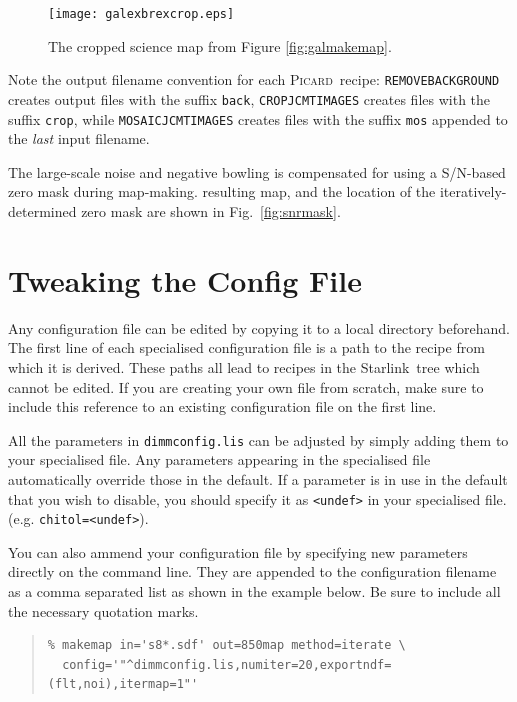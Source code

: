 \documentclass[twoside,11pt]{article}
\newcommand{\htmladdnormallink}[2]{#1}
\newcommand{\xref}[3]{#1}
\newcommand{\xlabel}[1]{}
\renewcommand{\_}{\texttt{\symbol{95}}}
\newenvironment{myquote}{\begin{quote}\begin{small}}{\end{small}\end{quote}}
\newcommand{\starlink}{\htmladdnormallink{Starlink}{http://starlink.jach.hawaii.edu}}
\newcommand{\picard}{\xref{\textsc{Picard}}{sun265}{}}
\newcommand{\drrecipe}[1]{\texttt{#1}}
\begin{document}
\begin{figure}
\begin{center}
\texttt{[image: galex\_brex\_crop.eps]}
\caption{\small The cropped science map from Figure \ref{fig:galmakemap}.}
\label{fig:exptime}
\end{center}
\end{figure}

Note the output filename convention for each \picard\ recipe:
\drrecipe{REMOVE\_BACKGROUND} creates output files with the suffix
\texttt{\_back}, \drrecipe{CROP\_JCMT\_IMAGES} creates files with the
suffix \texttt{\_crop}, while \drrecipe{MOSAIC\_JCMT\_IMAGES} creates
files with the suffix \texttt{\_mos} appended to the \textit{last} input
filename.

The large-scale noise and negative bowling is compensated for using a
S/N-based zero mask during map-making. resulting map, and the location of the
iteratively-determined zero mask are shown in Fig.~\ref{fig:snrmask}.



\clearpage
\section{\xlabel{tweak}Tweaking the Config File}
\label{sec:tweak}
Any configuration file can be edited by copying it to a local directory beforehand. The first line of each specialised configuration file is a path to the recipe from which it is derived. These paths all lead to recipes in the \starlink\ tree which cannot be edited. If you are creating your own file from scratch, make sure to include this reference to an existing configuration file on the first line.

All the parameters in \texttt{dimmconfig.lis} can be adjusted by simply adding them to your specialised file. Any parameters appearing in the specialised file automatically override those in the default. If a parameter is in use in the default that you wish to disable, you should specify it as \texttt{<undef>} in your specialised file. (e.g. \texttt{chitol=<undef>}).

You can also ammend your configuration file by specifying new parameters directly on the command line. They are appended to the configuration  filename as a comma separated list as shown in the example below. Be sure to include all the necessary quotation marks.

\begin{myquote}
\begin{verbatim}
% makemap in='s8*.sdf' out=850map method=iterate \
  config='"^dimmconfig.lis,numiter=20,exportndf=(flt,noi),itermap=1"'
\end{verbatim}
\end{myquote}
\end{document}
